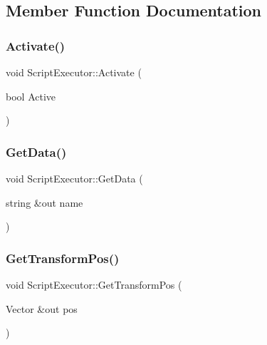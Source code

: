 \subsection{Member Function Documentation}
\hypertarget{class_script_executor_aa1459b94b16e14a17e02fd2fd0aefd8b}{}\label{class_script_executor_aa1459b94b16e14a17e02fd2fd0aefd8b} 
\subsubsection{\texorpdfstring{Activate()}{Activate()}}
{\footnotesize\ttfamily void Script\+Executor\+::\+Activate (\begin{DoxyParamCaption}\item[{bool}]{Active }\end{DoxyParamCaption})}

\hypertarget{class_script_executor_ae89049083a1e0028ab6b34536153a38f}{}\label{class_script_executor_ae89049083a1e0028ab6b34536153a38f} 
\subsubsection{\texorpdfstring{Get\+Data()}{GetData()}}
{\footnotesize\ttfamily void Script\+Executor\+::\+Get\+Data (\begin{DoxyParamCaption}\item[{string \&out}]{name }\end{DoxyParamCaption})}

\hypertarget{class_script_executor_af789f74e9ebe3a84c84f0d57bf9a5a0b}{}\label{class_script_executor_af789f74e9ebe3a84c84f0d57bf9a5a0b} 
\subsubsection{\texorpdfstring{Get\+Transform\+Pos()}{GetTransformPos()}}
{\footnotesize\ttfamily void Script\+Executor\+::\+Get\+Transform\+Pos (\begin{DoxyParamCaption}\item[{Vector \&out}]{pos }\end{DoxyParamCaption})}

